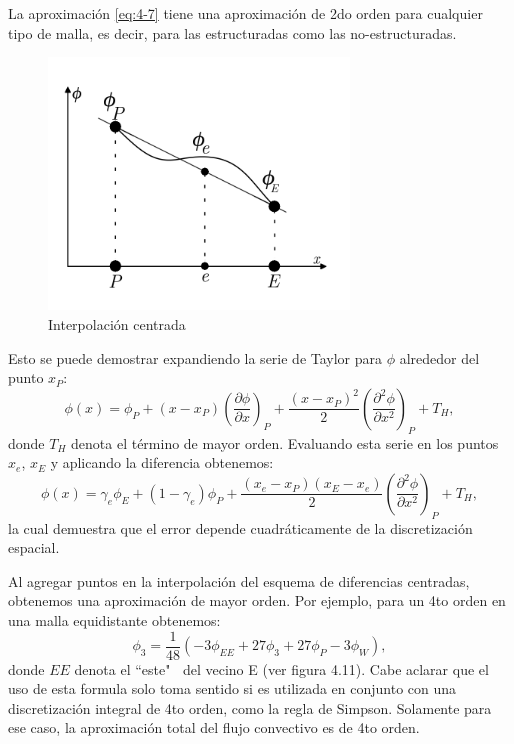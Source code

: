 \documentclass[a4paper,10pt, oneside]{book}
\begin{document}
La aproximación \ref{eq:4-7} tiene una aproximación de 2do orden para cualquier tipo de malla, es decir, para las estructuradas como las no-estructuradas. 
\begin{figure}[h!]
	\centering
	\includegraphics[width=8cm]{Img/4-9}
	\caption{Interpolación centrada}
	\label{img:4-9}
\end{figure}
Esto se puede demostrar expandiendo la serie de Taylor para $\phi$ alrededor del punto $x_P$:
\begin{equation}
	\phi(x) = \phi_P + (x-x_P) \left( \frac{\partial \phi}{\partial x} \right)_P + \frac{(x-x_P)^2}{2} \left( \frac{\partial^2 \phi}{\partial x^2} \right)_P + T_H, \nonumber
\end{equation}
donde $T_H$ denota el término de mayor orden. Evaluando esta serie en los puntos $x_e$, $x_E$ y aplicando la diferencia obtenemos:
\begin{equation}
	\phi(x) = \gamma_e \phi_E + (1-\gamma_e)\phi_P + \frac{(x_e-x_P)(x_E-x_e)}{2} \left( \frac{\partial^2 \phi}{\partial x^2} \right)_P + T_H, \nonumber
\end{equation}
la cual demuestra que el error depende cuadráticamente de la discretización espacial.

Al agregar puntos en la interpolación del esquema de diferencias centradas, obtenemos una aproximación de mayor orden. Por ejemplo, para un 4to orden en una malla equidistante obtenemos:
\begin{equation}
	\phi_3 = \frac{1}{48}(-3\phi_{EE} + 27\phi_3 + 27\phi_P -3\phi_W), \nonumber
\end{equation}
donde $EE$ denota el ``este" $~$ del vecino E (ver figura 4.11). Cabe aclarar que el uso de esta formula solo toma sentido si es utilizada en conjunto con una discretización integral de 4to orden, como la regla de Simpson. Solamente para ese caso, la aproximación total del flujo convectivo es de 4to orden.
\end{document}
